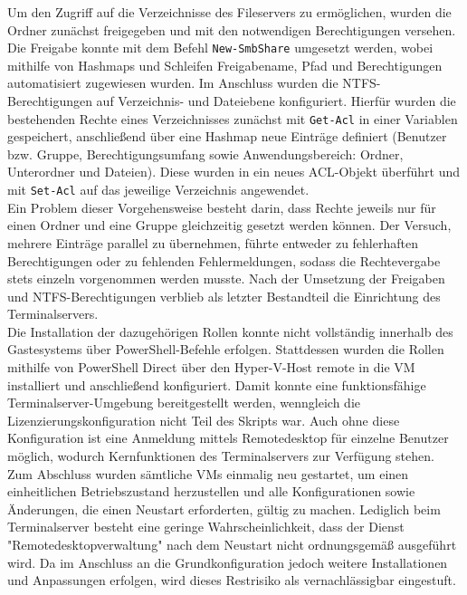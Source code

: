 \documentclass[a4paper,12pt]{article}
\begin{document}
Um den Zugriff auf die Verzeichnisse des Fileservers zu ermöglichen, wurden die Ordner zunächst freigegeben und mit den notwendigen Berechtigungen versehen.
Die Freigabe konnte mit dem Befehl \lstinline|New-SmbShare| umgesetzt werden, wobei mithilfe von Hashmaps und Schleifen Freigabename, Pfad und Berechtigungen automatisiert zugewiesen wurden.
Im Anschluss wurden die NTFS-Berechtigungen auf Verzeichnis- und Dateiebene konfiguriert.
Hierfür wurden die bestehenden Rechte eines Verzeichnisses zunächst mit \lstinline|Get-Acl| in einer Variablen gespeichert, anschließend über eine Hashmap neue Einträge definiert (Benutzer bzw. Gruppe, Berechtigungsumfang sowie Anwendungsbereich: Ordner, Unterordner und Dateien).
Diese wurden in ein neues ACL-Objekt überführt und mit \lstinline|Set-Acl| auf das jeweilige Verzeichnis angewendet.\\

Ein Problem dieser Vorgehensweise besteht darin, dass Rechte jeweils nur für einen Ordner und eine Gruppe gleichzeitig gesetzt werden können. 
Der Versuch, mehrere Einträge parallel zu übernehmen, führte entweder zu fehlerhaften Berechtigungen oder zu fehlenden Fehlermeldungen, sodass die Rechtevergabe stets einzeln vorgenommen werden musste. 
Nach der Umsetzung der Freigaben und NTFS-Berechtigungen verblieb als letzter Bestandteil die Einrichtung des Terminalservers.\\

Die Installation der dazugehörigen Rollen konnte nicht vollständig innerhalb des Gastesystems über PowerShell-Befehle erfolgen. 
Stattdessen wurden die Rollen mithilfe von PowerShell Direct über den Hyper-V-Host remote in die VM installiert und anschließend konfiguriert. 
Damit konnte eine funktionsfähige Terminalserver-Umgebung bereitgestellt werden, wenngleich die Lizenzierungskonfiguration nicht Teil des Skripts war. 
Auch ohne diese Konfiguration ist eine Anmeldung mittels Remotedesktop für einzelne Benutzer möglich, wodurch Kernfunktionen des Terminalservers zur Verfügung stehen.\\

Zum Abschluss wurden sämtliche VMs einmalig neu gestartet, um einen einheitlichen Betriebszustand herzustellen und alle Konfigurationen sowie Änderungen, die einen Neustart erforderten, gültig zu machen. 
Lediglich beim Terminalserver besteht eine geringe Wahrscheinlichkeit, dass der Dienst "Remotedesktopverwaltung" nach dem Neustart nicht ordnungsgemäß ausgeführt wird. 
Da im Anschluss an die Grundkonfiguration jedoch weitere Installationen und Anpassungen erfolgen, wird dieses Restrisiko als vernachlässigbar eingestuft.\\
\end{document}
